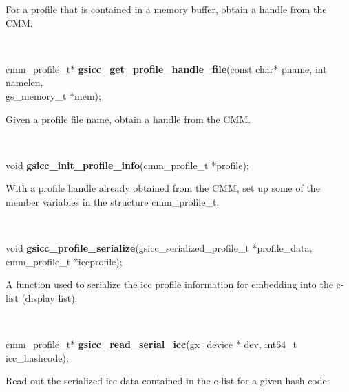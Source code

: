 \documentclass[12pt,notitlepage]{article}
\begin{document}
\begin{minipage}[h]{6.0in}
For a profile that is contained in a memory buffer, obtain a handle from the CMM.
\end{minipage}\\

\begin{tabbing}
\noindent cmm\_profile\_t* {\bf gsicc\_get\_profile\_handle\_file}(\=const char* pname, int namelen, \\
\>gs\_memory\_t *mem);\\
\end{tabbing}

\begin{minipage}[h]{6.0in}
Given a profile file name, obtain a handle from the CMM.
\end{minipage}\\

\begin{tabbing}
\noindent void {\bf gsicc\_init\_profile\_info}(cmm\_profile\_t *profile);\\
\end{tabbing}

\begin{minipage}[h]{6.0in}
With a profile handle already obtained from the CMM, set up some of the member variables in the structure cmm\_profile\_t.
\end{minipage}\\

\begin{tabbing}
\noindent void  {\bf gsicc\_profile\_serialize}(\=gsicc\_serialized\_profile\_t *profile\_data,\\
\>cmm\_profile\_t *iccprofile);\\
\end{tabbing}

\begin{minipage}[h]{6.0in}
A function used to serialize the icc profile information for embedding into the c-list (display list).
\end{minipage}\\

\begin{tabbing}
\noindent cmm\_profile\_t* {\bf gsicc\_read\_serial\_icc}(gx\_device * dev, int64\_t icc\_hashcode);\\
\end{tabbing}

\begin{minipage}[h]{6.0in}
Read out the serialized icc data contained in the c-list for a given hash code.
\end{minipage}\\
\end{document}

